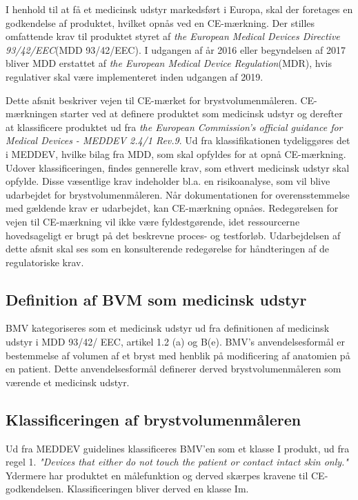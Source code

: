 I henhold til at få et medicinsk udstyr markedsført i Europa, skal der foretages en godkendelse af produktet, hvilket opnås ved en CE-mærkning. Der stilles omfattende krav til produktet styret af \textit{the European Medical Devices Directive 93/42/EEC}{}(MDD 93/42/EEC). I udgangen af år 2016 eller begyndelsen af 2017 bliver MDD erstattet af \textit{the European Medical Device Regulation}{}(MDR), hvis regulativer skal være implementeret inden udgangen af 2019. 
  
Dette afsnit beskriver vejen til CE-mærket for brystvolumenmåleren. CE-mærkningen starter ved at definere produktet som medicinsk udstyr og derefter at klassificere produktet ud fra \textit{the European Commission's official guidance for Medical Devices - MEDDEV 2.4/1 Rev.9}. Ud fra klassifikationen tydeliggøres det i MEDDEV, hvilke bilag fra MDD, som skal opfyldes for at opnå CE-mærkning. 
Udover klassificeringen, findes gennerelle krav, som ethvert medicinsk udstyr skal opfylde. Disse væsentlige krav indeholder bl.a. en risikoanalyse, som vil blive udarbejdet for brystvolumenmåleren. 
Når dokumentationen for overensstemmelse med gældende krav er udarbejdet, kan CE-mærkning opnåes.
Redegørelsen for vejen til CE-mærkning vil ikke være fyldestgørende, idet ressourcerne hovedsageligt er brugt på det beskrevne proces- og testforløb. Udarbejdelsen af dette afsnit skal ses som en konsulterende redegørelse for håndteringen af de regulatoriske krav. 

\subsection{Definition af BVM som medicinsk udstyr}

BMV kategoriseres som et medicinsk udstyr ud fra definitionen af medicinsk udstyr i MDD 93/42/ EEC, artikel 1.2 (a) og B(e). BMV's anvendelsesformål er bestemmelse af volumen af et bryst med henblik på modificering af anatomien på en patient. Dette anvendelsesformål definerer derved brystvolumenmåleren som værende et medicinsk udstyr. 

\subsection{Klassificeringen af brystvolumenmåleren}

Ud fra MEDDEV guidelines klassificeres BMV'en som et klasse I produkt, ud fra regel 1.  
\textit{"Devices that either do not touch the patient or contact intact skin only."} 
Ydermere har produktet en målefunktion og derved skærpes kravene til CE-godkendelsen. Klassificeringen bliver derved en klasse Im.

